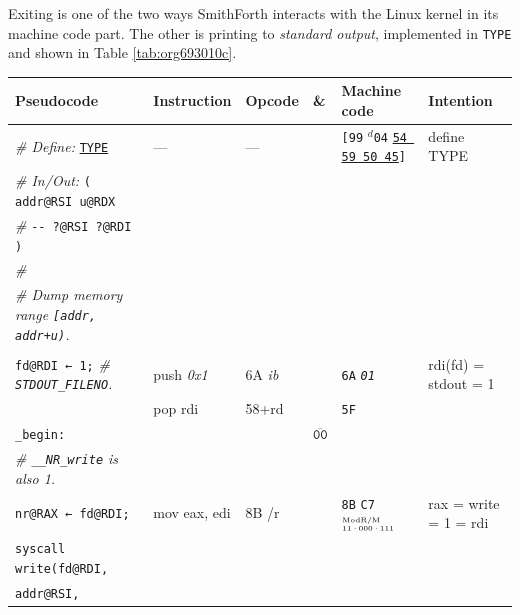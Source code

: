 \documentclass[a4paper,12pt,final]{article}
\begin{document}
Exiting is one of the two ways SmithForth interacts with the Linux
kernel in its machine code part.  The other is printing to \emph{standard
output}, implemented in \texttt{TYPE} and shown in Table \ref{tab:org693010c}.

\begin{table}[!htbp] \begin{adjustwidth}{-1cm}{-1cm} \fontsize{10}{12.000000}\selectfont
\begin{center}
\begin{tabular}{l|ll|l|lH}
\textbf{Pseudocode} & \textbf{Instruction} & \textbf{Opcode} & \textbf{\&} & \textbf{Machine code} & \textbf{Intention}\\[0pt]
\hline
\emph{\# Define:} \uline{\texttt{TYPE}} & --- & --- &  & \texttt{[99} \(^{d}\)​\texttt{04} \uline{\texttt{54 59 50 45}}​\texttt{]} & define TYPE\\[0pt]
\emph{\# In/Out:}    \texttt{( addr@RSI u@RDX} &  &  &  &  & \\[0pt]
\emph{\#\hspace{3.35em}} \texttt{-​- ?@RSI ?@RDI )} &  &  &  &  & \\[0pt]
\emph{\#} &  &  &  &  & \\[0pt]
\emph{\# Dump memory range \texttt{[addr, addr+u)}.} &  &  &  &  & \\[0pt]
 &  &  &  &  & \\[0pt]
\hspace{1em} \texttt{fd@RDI ← 1;}  \emph{\# \texttt{STDOUT\_FILENO}.} & push \emph{0x1} & 6A \emph{ib} &  & \texttt{6A} \emph{\texttt{01}} & rdi(fd) = stdout = 1\\[0pt]
 & pop rdi & 58+rd &  & \texttt{5F} & \\[0pt]
\texttt{\_begin:} &  &  & \(\overline{\texttt{00}}\)\footnotemark &  & \\[0pt]
\hspace{1em} \emph{\# \texttt{\_\_NR\_write} is also 1.} &  &  &  &  & \\[0pt]
\hspace{1em} \texttt{nr@RAX ← fd@RDI;} & mov eax, edi & 8B /r &  & \texttt{8B} \texttt{C7}​\(^{\text{\tiny ModR/M}}_{\text{\tiny 11·000·111}}\) & rax = write = 1 = rdi\\[0pt]
\hspace{1em} \texttt{syscall write(fd@RDI,} &  &  &  &  & \\[0pt]
\hspace{1em}\hspace{7.371000em}    \texttt{addr@RSI,} &  &  &  &  & \\[0pt]

\end{tabular}
\end{center}
\end{adjustwidth}
\end{table}
\end{document}

